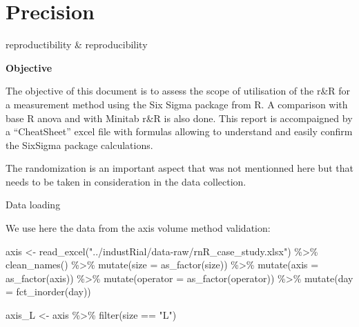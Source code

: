 \documentclass[
]{book}
\newenvironment{Shaded}{\begin{snugshade}}{\end{snugshade}}
\newcommand{\AttributeTok}[1]{\textcolor[rgb]{0.77,0.63,0.00}{#1}}
\newcommand{\FunctionTok}[1]{\textcolor[rgb]{0.00,0.00,0.00}{#1}}
\newcommand{\NormalTok}[1]{#1}
\newcommand{\OtherTok}[1]{\textcolor[rgb]{0.56,0.35,0.01}{#1}}
\newcommand{\SpecialCharTok}[1]{\textcolor[rgb]{0.00,0.00,0.00}{#1}}
\newcommand{\StringTok}[1]{\textcolor[rgb]{0.31,0.60,0.02}{#1}}
\begin{document}
\hypertarget{precision}{%
\section{Precision}\label{precision}}

reproductibility \& reproducibility

\textbf{Objective}

The objective of this document is to assess the scope of utilisation of the r\&R for a measurement method using the Six Sigma package from R. A comparison with base R anova and with Minitab r\&R is also done. This report is accompaigned by a ``CheatSheet'' excel file with formulas allowing to understand and easily confirm the SixSigma package calculations.

The randomization is an important aspect that was not mentionned here but that needs to be taken in consideration in the data collection.

Data loading

We use here the data from the axis volume method validation:

\begin{Shaded}
\begin{Highlighting}[]
\NormalTok{axis }\OtherTok{\textless{}{-}} \FunctionTok{read\_excel}\NormalTok{(}\StringTok{"../industRial/data{-}raw/rnR\_case\_study.xlsx"}\NormalTok{) }\SpecialCharTok{\%\textgreater{}\%} \FunctionTok{clean\_names}\NormalTok{() }\SpecialCharTok{\%\textgreater{}\%}
  \FunctionTok{mutate}\NormalTok{(}\AttributeTok{size =} \FunctionTok{as\_factor}\NormalTok{(size)) }\SpecialCharTok{\%\textgreater{}\%}
  \FunctionTok{mutate}\NormalTok{(}\AttributeTok{axis =} \FunctionTok{as\_factor}\NormalTok{(axis)) }\SpecialCharTok{\%\textgreater{}\%}
  \FunctionTok{mutate}\NormalTok{(}\AttributeTok{operator =} \FunctionTok{as\_factor}\NormalTok{(operator)) }\SpecialCharTok{\%\textgreater{}\%}
  \FunctionTok{mutate}\NormalTok{(}\AttributeTok{day =} \FunctionTok{fct\_inorder}\NormalTok{(day))}
\end{Highlighting}
\end{Shaded}

\begin{Shaded}
\begin{Highlighting}[]
\NormalTok{axis\_L }\OtherTok{\textless{}{-}}\NormalTok{ axis }\SpecialCharTok{\%\textgreater{}\%}
  \FunctionTok{filter}\NormalTok{(size }\SpecialCharTok{==} \StringTok{"L"}\NormalTok{)}
\end{Highlighting}
\end{Shaded}
\end{document}
